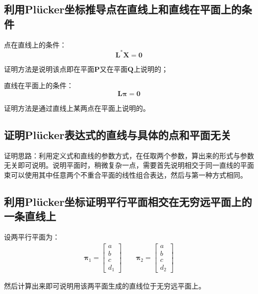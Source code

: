 \documentclass[11pt]{article}
\begin{document}
\subsection{利用Plücker坐标推导点在直线上和直线在平面上的条件}
点在直线上的条件：
\begin{equation*}
  \mathbf{L^*X}=\mathbf{0}
\end{equation*}\par
证明方法是说明该点即在平面$\mathbf{P}$又在平面$\mathbf{Q}$上说明的；\par
直线在平面上的条件：
\begin{equation*}
  \mathbold{L\pi}=\mathbf{0}
\end{equation*}\par
证明方法是通过直线上某两点在平面上说明的。
\subsection{证明Plücker表达式的直线与具体的点和平面无关}
证明思路：利用定义式和直线的参数方式，在任取两个参数，算出来的形式与参数无关即可说明。说明平面时，稍微复杂一点，需要首先说明相交于同一直线的平面束可以使用其中任意两个不重合平面的线性组合表达，然后与第一种方式相同。
\subsection{利用Plücker坐标证明平行平面相交在无穷远平面上的一条直线上}
设两平行平面为：
\begin{align*}
  \mathbold{\pi}_1=\begin{bmatrix}
                     a \\b\\c\\d_1
                   \end{bmatrix}\qquad\mathbold{\pi}_2=\begin{bmatrix}
                                                         a \\b\\c\\d_2
                                                       \end{bmatrix}
\end{align*}\par
然后计算出来即可说明用该两平面生成的直线位于无穷远平面上。
\end{document}
